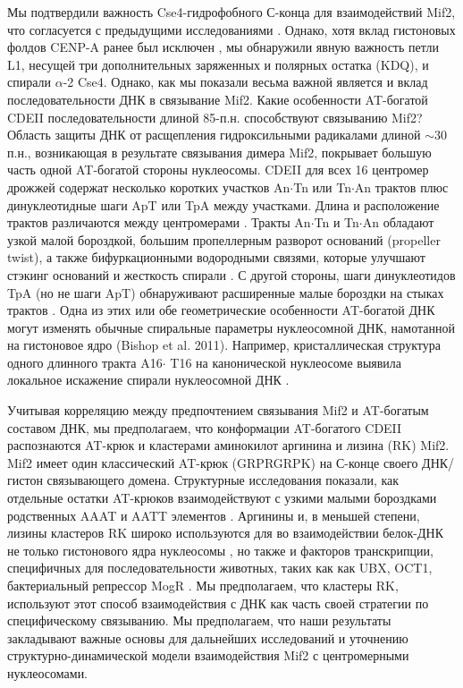 Мы подтвердили важность Cse4-гидрофобного С-конца для взаимодействий Mif2, что согласуется с предыдущими исследованиями \cite{carroll_dual_2010,guse_vitro_2011,kato_conserved_2013}. Однако, хотя вклад гистоновых фолдов CENP-A ранее был исключен \cite{guse_vitro_2011}, мы обнаружили явную важность петли L1, несущей три дополнительных заряженных и полярных остатка (KDQ), и спирали $\alpha$-2 Cse4. Однако, как мы показали весьма важной является и вклад последовательности ДНК в связывание Mif2. Какие особенности  AT-богатой CDEII последовательности длиной 85-п.н. способствуют связыванию Mif2? Область защиты ДНК от расщепления гидроксильными радикалами длиной $\sim$30 п.н., возникающая в результате связывания димера Mif2, покрывает большую часть одной AT-богатой стороны нуклеосомы. CDEII для всех 16 центромер дрожжей содержат несколько коротких участков An$\cdot$Tn или Tn$\cdot$An трактов плюс динуклеотидные шаги ApT или TpA между участками. Длина и расположение трактов различаются между центромерами \cite{baker_genetic_2005}. Тракты An$\cdot$Tn и Tn$\cdot$An обладают узкой малой бороздкой, большим пропеллерным разворот оснований (propeller twist), а также бифуркационными водородными связями, которые улучшают стэкинг оснований и жесткость спирали \cite{coll_bifurcated_1987,nelson_structure_1987}. С другой стороны, шаги динуклеотидов TpA (но не шаги ApT) обнаруживают расширенные малые бороздки на стыках трактов \cite{stefl_dna_2004}. Одна из этих или обе геометрические особенности AT-богатой ДНК могут изменять обычные спиральные параметры нуклеосомной ДНК, намотанной на гистоновое ядро (Bishop et al. 2011). Например, кристаллическая структура одного длинного тракта A16$\cdot$ T16 на канонической нуклеосоме выявила локальное искажение спирали нуклеосомной ДНК \cite{bao_nucleosome_2006}.

Учитывая корреляцию между предпочтением связывания Mif2 и AT-богатым составом ДНК, мы предполагаем, что конформации AT-богатого CDEII распознаются AT-крюк и кластерами аминокилот аргинина и лизина (RK) Mif2. Mif2 имеет один классический AT-крюк (GRPRGRPK) на С-конце своего ДНК/гистон связывающего домена. Структурные исследования показали, как отдельные остатки AT-крюков взаимодействуют с узкими малыми бороздками родственных AAAT и AATT элементов \cite{reeves_t-dna-binding_1990,huth_solution_1997,reeves_structure_2000}. Аргинины и, в меньшей степени, лизины кластеров RK широко используются для во взаимодействии белок-ДНК не только гистонового ядра нуклеосомы \cite{luger_crystal_1997}, но также и факторов транскрипции, специфичных для последовательности животных, таких как как UBX, OCT1, бактериальный репрессор MogR \cite{rohs_role_2009,rohs_origins_2010,shen_recognition_2009,kong_functional_2015}. Мы предполагаем, что кластеры RK, используют этот способ взаимодействия с ДНК как часть своей стратегии по специфическому связыванию. Мы предполагаем, что наши результаты закладывают важные основы для дальнейших исследований и уточнению структурно-динамической модели взаимодействия Mif2 с центромерными нуклеосомами.